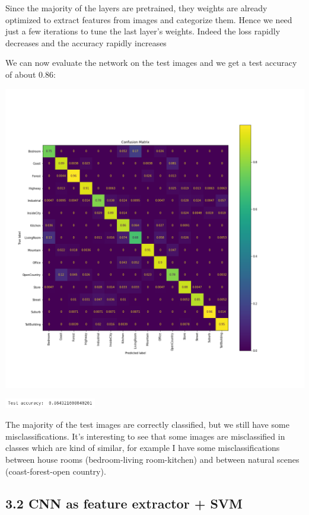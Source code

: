 \documentclass[12pt, a4paper]{report}
\begin{document}
Since the majority of the layers are  pretrained, they weights are already optimized to extract features from images and categorize them. Hence we need just a few iterations to tune the last layer's weights. Indeed the loss rapidly decreases and the accuracy rapidly increases

We can now evaluate the network on the test images and we get a test accuracy of about 0.86:

\begin{center}
	\includegraphics[width=\textwidth]{img/conf_finetune.png}	
\end{center}
\includegraphics[width=0.3\textwidth]{img/test_accuracy_finetune.png}

The majority of the test images are correctly classified, but we still have some misclassifications.
It's interesting to see that some images are misclassified in classes which are kind of similar, for example I have some misclassifications between house rooms (bedroom-living room-kitchen) and between natural scenes (coast-forest-open country).

\subsection*{3.2 CNN as feature extractor + SVM}
\end{document}
